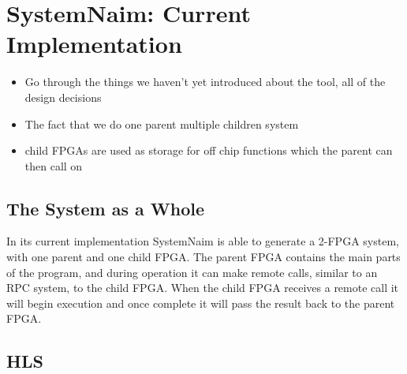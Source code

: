 \chapter{SystemNaim: Current Implementation}

\begin{itemize}
    \item Go through the things we haven't yet introduced about the tool, all of the design decisions
    \item The fact that we do one parent multiple children system
    \item child FPGAs are used as storage for off chip functions which the parent can then call on
\end{itemize}

\section{The System as a Whole}

In its current implementation SystemNaim is able to generate a 2-FPGA system, with one parent and one child FPGA. The parent FPGA contains the main parts of the program, and during operation it can make remote calls, similar to an RPC system, to the child FPGA. When the child FPGA receives a remote call it will begin execution and once complete it will pass the result back to the parent FPGA. 

\section{HLS}

